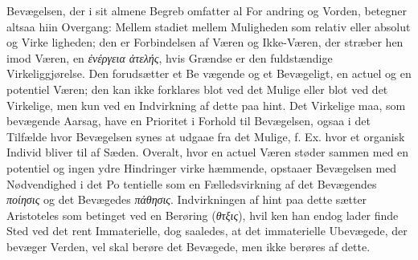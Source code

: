 \documentclass[12pt,a4paper]{book}
\newcommand{\gk}[1]{\textit{#1}}
\begin{document}
Bevægelsen, der i sit almene Begreb omfatter al For\-%
andring og Vorden, betegner altsaa hiin Overgang: Mellem\-%
stadiet mellem Muligheden som relativ eller absolut og Virke\-%
ligheden; den er Forbindelsen af Væren og Ikke-Væren, der
stræber hen imod Væren, en \gk{ἐνέργεια ἀτελής}, hvis Grændse
er den fuldstændige Virkeliggjørelse. Den forudsætter et Be\-%
vægende og et Bevægeligt, en actuel og en potentiel Væren;
den kan ikke forklares blot ved det Mulige eller blot ved det
Virkelige, men kun ved en Indvirkning af dette paa hint.
Det Virkelige maa, som bevægende Aarsag, have en Prioritet
i Forhold til Bevægelsen, ogsaa i det Tilfælde hvor Bevægelsen
synes at udgaae fra det Mulige, f. Ex. hvor et organisk Individ
bliver til af Sæden. Overalt, hvor en actuel Væren støder
sammen med en potentiel og ingen ydre Hindringer virke
hæmmende, opstaaer Bevægelsen med Nødvendighed i det Po\-%
tentielle som en Fælledsvirkning af det Bevægendes \gk{ποίησις} og
det Bevægedes \gk{πάθησις}. Indvirkningen af hint paa dette
sætter Aristoteles som betinget ved en Berøring (\gk{θτξις}), hvil\-%
ken han endog lader finde Sted ved det rent Immaterielle, dog
saaledes, at det immaterielle Ubevægede, der bevæger Verden,
vel skal berøre det Bevægede, men ikke berøres af dette.
\end{document}
